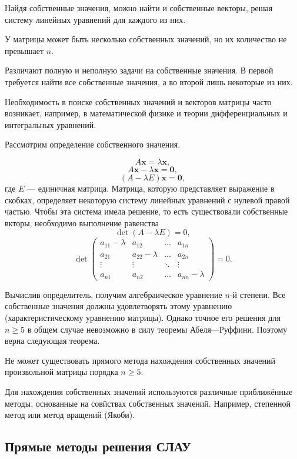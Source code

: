 Найдя собственные значения, можно найти и собственные векторы, решая
систему линейных уравнений для каждого из них.

У матрицы может быть несколько собственных значений, но их количество
не превышает $n$.

Различают полную и неполную задачи на собственные значения. В первой
требуется найти все собственные значения, а во второй лишь некоторые
из них.

Необходимость в поиске собственных значений и векторов матрицы часто
возникает, например, в математической физике и теории дифференциальных
и интегральных уравнений.

Рассмотрим определение собственного значения.

\[
A\mathbf{x}=\lambda\mathbf{x},
\]
\[
A\mathbf{x}-\lambda\mathbf{x}=\mathbf{0},
\]
\[
(A-\lambda E)\mathbf{x}=\mathbf{0},
\]
где $E$ — единичная матрица. Матрица, которую представляет выражение
в скобках, определяет некоторую систему линейных уравнений с нулевой
правой частью. Чтобы эта система имела решение, то есть существовали
собственные вкторы, необходимо выполнение равенства
\[
\det(A-\lambda E)=0,
\]
\[
\det\begin{pmatrix}a_{11}-\lambda & a_{12} & \dots & a_{1n}\\
a_{21} & a_{22}-\lambda & \dots & a_{2n}\\
\vdots & \vdots & \ddots & \vdots\\
a_{n1} & a_{n2} & \ldots & a_{nn}-\lambda
\end{pmatrix}=0.
\]


Вычислив определитель, получим алгебраическое уравнение $n$-й степени.
Все собственные значения должны удовлетворять этому уравнению (характеристическому
уравнению матрицы). Однако точное его решения для $n\geqslant5$ в
общем случае невозможно в силу теоремы Абеля—Руффини. Поэтому верна
следующая теорема.
\begin{thm}
Не может существовать прямого метода нахождения собственных значений
произвольной матрицы порядка $n\geqslant5$.
\end{thm}
Для нахождения собственных значений используются различные приближённые
методы, основанные на совйствах собственных значений. Например, степенной
метод или метод вращений (Якоби).


\subsection{Прямые методы решения СЛАУ}

